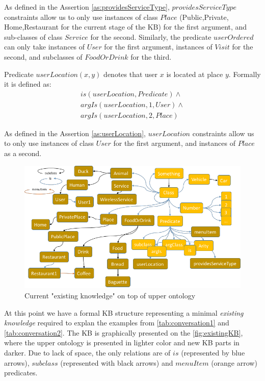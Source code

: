 As defined in the Assertion \ref{as:providesServiceType}, $providesServiceType$
constraints allow us to only use instances of class $Place$ (Public,Private,
Home,Restaurant for the current stage of the KB) for the first argument, and 
sub-classes of class $Service$ for the second. Similarly, the predicate
$userOrdered$ can only take instances of $User$ for the first argument, 
instances of $Visit$ for the second, and subclasses of $FoodOrDrink$ for the
third.

\begin{definition}\label{def:userLocation}
Predicate $userLocation(x,y)$ denotes that user $x$ is located at place 
$y$. Formally it is defined as:
\begin{equation}\label{as:userLocation}
\begin{gathered}
    is(userLocation,Predicate) \land \\
	argIs(userLocation,1,User) \land\\
	argIs(userLocation,2, Place)
\end{gathered}
\end{equation}
\end{definition}
As defined in the Assertion \ref{as:userLocation}, $userLocation$
constraints allow us to only use instances of class $User$ for the first
argument, and instances of $Place$ as a second.

\begin{figure}[H]
	\centering
		\includegraphics[width=1\textwidth]{figures/fullExistingKB.png}
	\caption{Current "existing knowledge" on top of upper ontology}
	\label{fig:existingKB}
\end{figure}

At this point we have a formal KB structure representing a minimal 
\emph{existing knowledge} required to explan the examples from 
\autoref{tab:conversation1} and \autoref{tab:conversation2}. The KB is
graphically presented on the \autoref{fig:existingKB}, where the upper ontology
is presented in lighter color and new KB parts in darker. Due to lack of space,
the only relations are of $is$ (represented by blue arrows), $subclass$ 
(represented with black arrows) and $menuItem$ (orange arrow) predicates.

